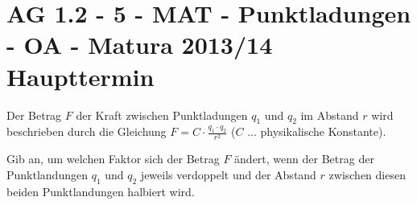 \section{AG 1.2 - 5 - MAT - Punktladungen - OA - Matura 2013/14 Haupttermin}

\begin{beispiel}[AG 1.2]{1} %
				Der Betrag $F$ der Kraft zwischen Punktladungen $q_1$ und $q_2$ im Abstand $r$ wird beschrieben durch die Gleichung $F=C\cdot \frac{q_1\cdot q_2}{r^2}$ ($C$ ... physikalische Konstante).
				
				Gib an, um welchen Faktor sich der Betrag $F$ ändert, wenn der Betrag der Punktlandungen $q_1$ und $q_2$ jeweils verdoppelt und der Abstand $r$ zwischen diesen beiden Punktlandungen halbiert wird.\leer
				
\end{beispiel}